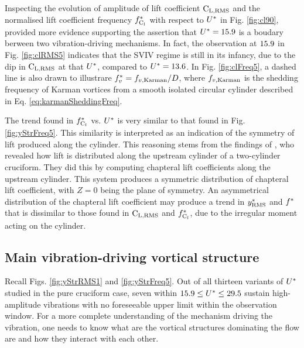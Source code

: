 \documentclass[oneside]{utmthesis}
\begin{document}
Inspecting the evolution of \rms{} amplitude of lift coefficient $\text{C}_{\text{L,RMS}}$ and the normalised lift coefficient frequency $f_{\text{C}_{l}}^{*}$ with respect to $U^{*}$ in Fig. \ref{fig:cl90}, provided more evidence supporting the assertion that $U^{*} = 15.9$ is a boudary berween two vibration-driving mechanisms. In fact, the observation at $15.9$ in Fig. \ref{fig:clRMS5} indicates that the SVIV regime is still in its infancy, due to the dip in $\text{C}_{\text{L,RMS}}$ at that $U^{*}$, compared to $U^{*} = 13.6$. In Fig. \ref{fig:clFreq5}, a dashed line is also drawn to illustrare $f^{*}_{v} = f_{v,\text{Karman}}/D$, where $f_{v,\text{Karman}}$ is the shedding frequency of Karman vortices from a smooth isolated circular cylinder described in Eq. \ref{eq:karmanSheddingFreq}.

The trend found in $f_{\text{C}_{l}}^{*}$ vs. $U^{*}$ is very similar to that found in Fig. \ref{fig:yStrFreq5}. This similarity is interpreted as an indication of the symmetry of lift produced along the cylinder. This reasoning stems from the findings of \citet{Zhao2018a}, who revealed how lift is distributed along the upstream cylinder of a two-cylinder \angfi{} cruciform. They did this by computing chapteral lift coefficients along the upstream cylinder. This system produces a symmetric distribution of chapteral lift coefficient, with $Z = 0$ being the plane of symmetry. An asymmetrical distribution of the chapteral lift coefficient may produce a trend in $y^{*}_{\text{RMS}}$ and $f^{*}$ that is dissimilar to those found in $\text{C}_{\text{L,RMS}}$ and $f_{\text{C}_{l}}^{*}$, due to the irregular moment acting on the cylinder.

\subsection{Main vibration-driving vortical structure}\label{ssec:svivRegimeVortStruct}
Recall Figs. \ref{fig:yStrRMS1} and \ref{fig:yStrFreq5}. Out of all thirteen variants of $U^{*}$ studied in the pure cruciform case, seven within $15.9 \leq U^{*} \leq 29.5$ sustain high-amplitude vibrations with no foreseeable upper limit within the observation window. For a more complete understanding of the mechanism driving the vibration, one needs to know what are the vortical structures dominating the flow are and how they interact with each other.
\end{document}
